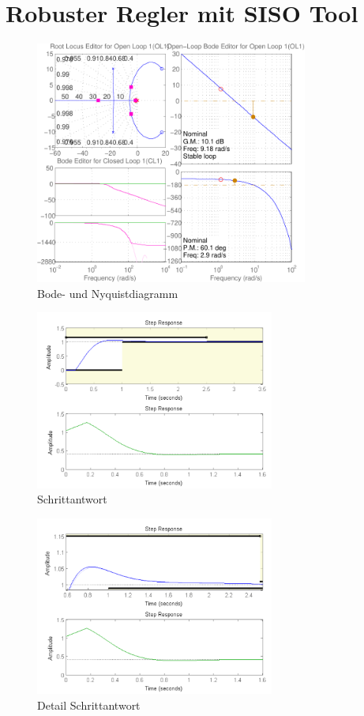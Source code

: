 \section{Robuster Regler mit SISO Tool}
\begin{figure}[h!]
    \centering
    \includegraphics[width=0.8\textwidth]{07/diag_siso.pdf}
    \caption{Bode- und Nyquistdiagramm}
    \label{fig:07a}
\end{figure}
\begin{figure}[h!]
    \centering
    \includegraphics[width=0.7\textwidth]{07/step_siso.pdf}
    \caption{Schrittantwort}
    \label{fig:07b}
\end{figure}
\begin{figure}[h!]
    \centering
    \includegraphics[width=0.7\textwidth]{07/step_detail_siso.pdf}
    \caption{Detail Schrittantwort}
    \label{fig:07c}
\end{figure}

